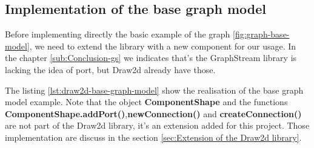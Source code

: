 \subsection{Implementation of the base graph model}
\label{sub:Implementation of the base graph model}

Before implementing directly the basic example of the graph \ref{fig:graph-base-model},
we need to extend the library with a new component for our usage.
In the chapter \ref{sub:Conclusion-gs} we indicates that's the GraphStream library is lacking the idea of port, but Draw2d already have those.

The listing \ref{lst:draw2d-base-graph-model} show the realisation of the base
graph model example. Note that the object \textbf{ComponentShape} and the
functions \textbf{ComponentShape.addPort()},\textbf{newConnection()} and
\textbf{createConnection()} are not part of the Draw2d library, it's an
extension added for this project. Those implementation are discuss in the
section \ref{sec:Extension of the Draw2d library}.


